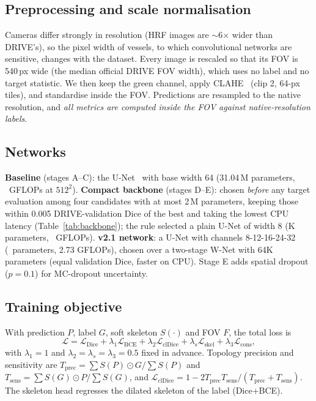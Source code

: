 \documentclass[conference]{IEEEtran}
\begin{document}
\subsection{Preprocessing and scale normalisation}
Cameras differ strongly in resolution (HRF images are $\sim$6$\times$ wider than DRIVE's), so the pixel width of vessels, to which convolutional networks are sensitive, changes with the dataset. Every image is rescaled so that its FOV is 540\,px wide (the median official DRIVE FOV width), which uses no label and no target statistic. We then keep the green channel, apply CLAHE~\cite{zuiderveld1994} (clip 2, 64-px tiles), and standardise inside the FOV. Predictions are resampled to the native resolution, and \emph{all metrics are computed inside the FOV against native-resolution labels}.

\subsection{Networks}
\textbf{Baseline} (stages A--C): the U-Net~\cite{ronneberger2015} with base width 64 (31.04\,M parameters, \gflopsA\ GFLOPs at $512^2$). \textbf{Compact backbone} (stages D--E): chosen \emph{before} any target evaluation among four candidates with at most 2\,M parameters, keeping those within 0.005 DRIVE-validation Dice of the best and taking the lowest CPU latency (Table~\ref{tab:backbone}); the rule selected a plain U-Net of width 8 (\compactParams K parameters, \gflopsE\ GFLOPs). \textbf{v2.1 network}: a U-Net with channels 8-12-16-24-32 (\hParamsExact\ parameters, 2.73 GFLOPs), chosen over a two-stage W-Net with 64K parameters (equal validation Dice, faster on CPU). Stage E adds spatial dropout ($p{=}0.1$) for MC-dropout uncertainty.

\begin{table}[t]
\centering
\caption{Compact-backbone selection (DRIVE validation only, 3 seeds, CPU: 4 threads, $512^2$). All candidates fall within the 0.005 tolerance; the fastest is chosen.}
\label{tab:backbone}
\footnotesize

\end{table}

\subsection{Training objective}
With prediction $P$, label $G$, soft skeleton $S(\cdot)$ and FOV $F$, the total loss is
\begin{equation}
\mathcal L=\mathcal L_{\mathrm{Dice}}+\lambda_1\mathcal L_{\mathrm{BCE}}+\lambda_2\mathcal L_{\mathrm{clDice}}+\lambda_s\mathcal L_{\mathrm{skel}}+\lambda_3\mathcal L_{\mathrm{cons}},
\label{eq:loss}
\end{equation}
with $\lambda_1{=}1$ and $\lambda_2{=}\lambda_s{=}\lambda_3{=}0.5$ fixed in advance. Topology precision and sensitivity are $T_{\mathrm{prec}}=\sum S(P)\odot G/\sum S(P)$ and $T_{\mathrm{sens}}=\sum S(G)\odot P/\sum S(G)$, and $\mathcal L_{\mathrm{clDice}}=1-2T_{\mathrm{prec}}T_{\mathrm{sens}}/(T_{\mathrm{prec}}+T_{\mathrm{sens}})$. The skeleton head regresses the dilated skeleton of the label (Dice+BCE).
\end{document}
